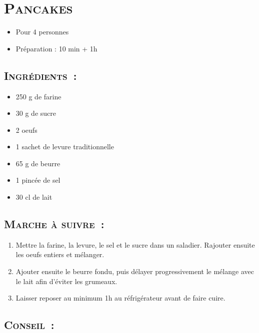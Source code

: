 \section[\normalsize{Pancakes}]{\LARGE{\textsc{Pancakes}}}		%


\begin{itemize}
\item Pour 4 personnes
\item Préparation : 10 min + 1h
\end{itemize}

\subsection*{\textsc{Ingr\'edients~:}}

\begin{itemize}
\item 250 g de farine
\item 30 g de sucre
\item 2 oeufs
\item 1 sachet de levure traditionnelle 
\item 65 g de beurre 
\item 1 pinc\'ee de sel 
\item 30 cl de lait
\end{itemize}


\subsection*{\textsc{Marche \`a suivre~:}}

\begin{enumerate}
\item Mettre la farine, la levure, le sel et le sucre dans un saladier. Rajouter ensuite les oeufs entiers et m\'elanger.
\item Ajouter ensuite le beurre fondu, puis d\'elayer progressivement le m\'elange avec le lait afin d'\'eviter les 
grumeaux.
\item Laisser reposer au minimum 1h au r\'efrig\'erateur avant de faire cuire.
\end{enumerate}
\subsection*{\textsc{Conseil~:}}
